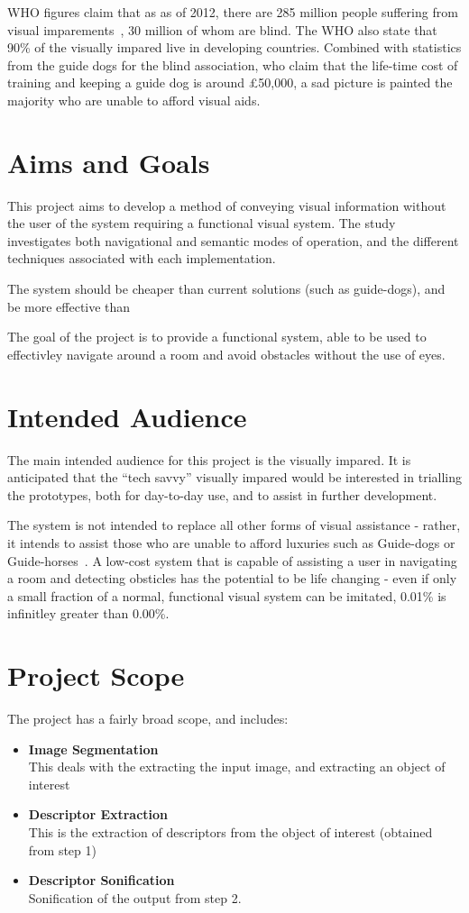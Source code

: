 \label{chap:introduction}
\ac{WHO} figures claim that as as of 2012, there are 285 million people suffering from visual imparements~\cite{whoblindness}, 30 million of whom are blind. The \ac{WHO} also state that 90\% of the visually impared live in developing countries. Combined with statistics from the guide dogs for the blind association, who claim that the life-time cost of training and keeping a guide dog is around £50,000, a sad picture is painted the majority who are unable to afford visual aids.

\section{Aims and Goals}
This project aims to develop a method of conveying visual information without the user of the system requiring a functional visual system. The study investigates both navigational and semantic modes of operation, and the different techniques associated with each implementation.

The system should be cheaper than current solutions (such as guide-dogs), and be more effective than 

The goal of the project is to provide a functional system, able to be used to effectivley navigate around a room and avoid obstacles without the use of eyes.  

\section{Intended Audience}
The main intended audience for this project is the visually impared. It is anticipated that the ``tech savvy'' visually impared would be interested in trialling the prototypes, both for day-to-day use, and to assist in further development.

The system is not intended to replace all other forms of visual assistance - rather, it intends to assist those who are unable to afford luxuries such as Guide-dogs or Guide-horses~\cite{guidehorse}. A low-cost system that is capable of assisting a user in navigating a room and detecting obsticles has the potential to be life changing - even if only a small fraction of a normal, functional visual system can be imitated, 0.01\% is infinitley greater than 0.00\%.

\section{Project Scope}
The project has a fairly broad scope, and includes:
\begin{itemize}
    \item \textbf{Image Segmentation} \hfill \\
        This deals with the extracting the input image, and extracting an object of interest
    \item \textbf{Descriptor Extraction} \hfill \\
        This is the extraction of descriptors from the object of interest (obtained from step 1)
    \item \textbf{Descriptor Sonification} \hfill \\
        Sonification of the output from step 2.
\end{itemize}

